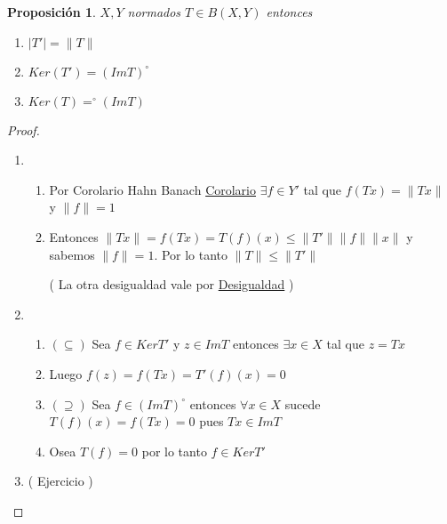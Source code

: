 \documentclass[10pt]{extarticle}
\theoremstyle{break}
\newtheorem{proposition}{Proposición}
\theoremstyle{definition}
\begin{document}
\begin{proposition}
	$X,Y$ normados $T\in B( X,Y )$ entonces
	\begin{enumerate}
		\item $ \lvert T' \rvert =\lVert T \rVert  $ 
		\item $ Ker( T')=( Im T)^{\circ}  $ 
		\item $ Ker( T)=^{\circ}( Im T)  $  
	\end{enumerate}
\end{proposition}
\begin{proof} 
	\begin{enumerate}
		\item 
			\begin{enumerate}
				\item Por Corolario Hahn Banach \hyperref[10.0]{Corolario}  $ \exists f\in Y' $ tal que $ f( Tx)=\lVert Tx \rVert  $ y $ \lVert f \rVert =1$ 
				\item Entonces $ \lVert Tx \rVert =f( Tx)=T( f)( x)\leq \lVert T' \rVert \lVert f \rVert \lVert x \rVert$ y sabemos $ \lVert f \rVert =1 $. Por lo tanto $ \lVert T \rVert \leq \lVert T' \rVert  $ 

					( La otra desigualdad vale por \hyperref[des]{Desigualdad} )    
			\end{enumerate}
		\item 
			\begin{enumerate}
				\item $ ( \subseteq ) $  Sea $ f\in Ker T'  $ y $ z\in Im T  $ entonces $ \exists x\in X  $ tal que $ z=Tx$   
				\item Luego $ f( z)=f( Tx)=T'( f)( x) =0$
				\item $ ( \supseteq) $ Sea $ f\in ( ImT)^{\circ}   $ entonces $ \forall x\in X  $ sucede $ T( f)( x)=f( Tx)=0 $ pues $ Tx\in ImT  $ 
				\item Osea $ T( f)=0 $ por lo tanto $ f\in KerT'$ 
			\end{enumerate}  
	\item ( Ejercicio )
	\end{enumerate} 
\end{proof}
\end{document}
